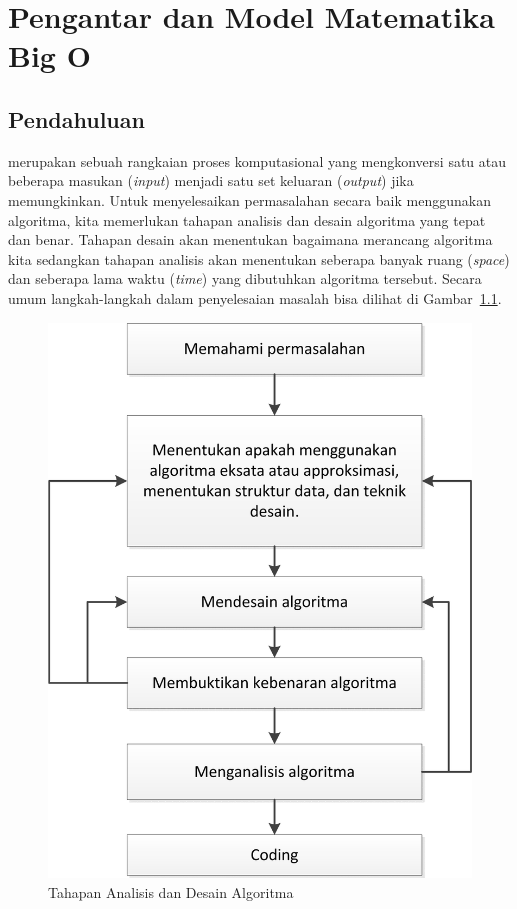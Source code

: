 \chapter{Pengantar dan Model Matematika Big O}\label{ch:modul1}

\section{Pendahuluan}

 merupakan sebuah rangkaian proses komputasional yang mengkonversi satu atau beberapa masukan (\textit{input}) menjadi satu set keluaran (\textit{output}) jika memungkinkan. Untuk menyelesaikan permasalahan secara baik menggunakan algoritma, kita memerlukan tahapan analisis dan desain algoritma yang tepat dan benar. Tahapan desain akan menentukan bagaimana merancang algoritma kita sedangkan tahapan analisis akan menentukan seberapa banyak ruang (\textit{space}) dan seberapa lama waktu (\textit{time}) yang dibutuhkan algoritma tersebut. Secara umum langkah-langkah dalam penyelesaian masalah bisa dilihat di Gambar~\ref{fig:TahapanAnalisisDanDesain}.

\begin{figure}
    \includegraphics[scale=0.8]{fig/TahapanAnalisisDanDesain}
    \caption{Tahapan Analisis dan Desain Algoritma}
    \label{fig:TahapanAnalisisDanDesain}
\end{figure}

